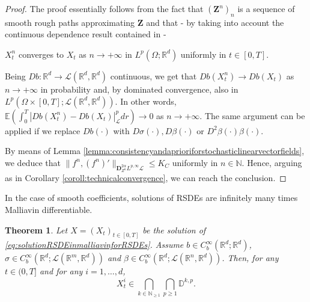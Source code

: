 \documentclass[11pt,a4paper]{article}
\newcommand{\R}{\mathbb{R}}
\newcommand{\E}{\mathbb{E}}
\theoremstyle{plain}
\newtheorem{thm}[defn]{Theorem}
\begin{document}
\begin{proof}
    The proof essentially follows from the fact that $(\mathbf{Z}^n)_n$ is a sequence of smooth rough paths approximating $\mathbf{Z}$ and that - by taking into account the continuous dependence result contained in \cite[Theorem 4.9]{FHL21} -
    {
    $X^n_t$ converges to $X_t$ as $n \to +\infty$ in $L^p(\Omega;\R^d)$ uniformly in $t \in [0,T]$. 


    Being $Db:\R^d \to \mathscr{L}(\R^d,\R^d)$ continuous, we get that $Db(X^n_t) \to Db(X_t)$ as $n \to +\infty$ in probability and, by dominated convergence, also in $L^p(\Omega \times [0,T]; \mathscr{L}(\R^d,\R^d))$. In other words, $\E(\int_0^T |Db(X^n_t) - Db(X_t)|_\mathscr{L}^p dr) \to 0$ as $n \to +\infty$. 
    The same argument can be applied if we replace $Db(\cdot)$ with $D\sigma(\cdot), D\beta (\cdot)$ or $D^2\beta(\cdot)\beta(\cdot)$. \\
    }
    By means of Lemma \ref{lemma:consistencyandaprioriforstochasticlinearvectorfields}, we deduce that $\|f^n,(f^n)'\|_{ \mathbf{D}^{2\alpha}_{Z^n} L^{p,\infty}\mathscr{L}} \le K_C$ uniformly in $n \in \mathbb{N}$. 
    Hence, arguing as in Corollary \ref{coroll:technicalconvergence}, we can reach the conclusion.
\end{proof}


In the case of smooth coefficients, solutions of RSDEs are infinitely many times Malliavin differentiable. 
\begin{thm} Let $X=(X_t)_{t\in [0,T]}$ be the solution of \eqref{eq:solutionRSDEinmalliavinforRSDEs}. Assume $b \in {C}^\infty_b(\R^d;\R^d)$, $\sigma\in {C}^\infty_b(\R^d;\mathscr{L}(\R^m,\R^d))$ and $\beta \in {C}^\infty_b(\R^d;\mathscr{L}(\R^n,\R^d))$.  Then, for any $t \in (0,T]$ and for any $i=1,\dots,d$, 
    \begin{equation*}
        X_t^i \in \bigcap_{k \in \mathbb{N}_{\ge 1}} \bigcap_{p \ge 1} \mathbb{D}^{k,p}.
    \end{equation*}
\end{thm}
\end{document}
